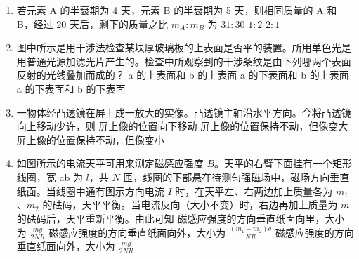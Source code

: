 \documentclass[\gkver]{gaokaozhenti}
\begin{document}
\begin{enumerate}

\item
若元素 A 的半衰期为 4 天，元素 B 的半衰期为 5 天，则相同质量的 A 和 B，经过 20 天后，剩下的质量之比 $m_{A}:m_{B}$ 为
{$31:30$}
{$1:2$}
{$2:1$}


\item
图中所示是用干涉法检查某块厚玻璃板的上表面是否平的装置。所用单色光是用普通光源加滤光片产生的。检查中所观察到的干涉条纹是由下列哪两个表面反射的光线叠加而成的？
\onepicture[w=4.41cm]{}
{a 的上表面和 b 的上表面}
{a 的下表面和 b 的上表面}
{a 的下表面和 b 的下表面}


\item
一物体经凸透镜在屏上成一放大的实像。凸透镜主轴沿水平方向。今将凸透镜向上移动少许，则
{屏上像的位置向下移动}
{屏上像的位置保持不动，但像变大}
{屏上像的位置保持不动，但像变小}


\item
如图所示的电流天平可用来测定磁感应强度 $B$。天平的右臂下面挂有一个矩形线圈，宽 ab 为 $l$，共 $N$ 匝，线圈的下部悬在待测匀强磁场中，磁场方向垂直纸面。当线圈中通有图示方向电流 $I$ 时，在天平左、右两边加上质量各为 $m_{1}$、$m_{2}$ 的砝码，天平平衡。当电流反向（大小不变）时，右边再加上质量为 $m$ 的砝码后，天平重新平衡。由此可知
{磁感应强度的方向垂直纸面向里，大小为 $\frac{mg}{2NIl}$}
{磁感应强度的方向垂直纸面向外，大小为 $\frac{(m_{1}-m_{2})g}{NIl}$}
{磁感应强度的方向垂直纸面向外，大小为 $\frac{mg}{2NIl}$}


\end{enumerate}
\end{document}
